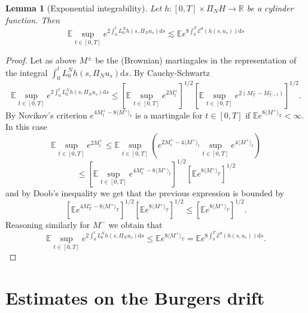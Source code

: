 \documentclass[11pt,a4paper,draft,reqno]{amsart}
\newtheorem{lemma}{Lemma}
\newcommand{\RR}{\mathbb{R}}
\newcommand{\expect}{\mathbb{E}}
\newcommand{\cE}{\mathcal{E}}
\newcommand{\dd}{\mathrm{d}}
\begin{document}
\begin{lemma}[Exponential integrability] 
Let  $h : [0,T]\times \Pi_N H \to \RR$ be a cylinder function. Then
\begin{equation}
\label{eq:exp-ito-trick}
\expect \sup_{t\in[0,T]}e^{2 \int_0^t L_0^N h(s,\Pi_N u_s) \dd s} \lesssim 
\expect e^{8 \int_0^T \cE^\theta(h(s,u_s)) \dd s } 
\end{equation}
\end{lemma}
\begin{proof}
Let as above $M^\pm$ be the (Brownian) martingales in the representation of the integral $\int_0^t L_0^N h(s,\Pi_N u_s) \dd s$. By Cauchy-Schwartz
$$
\expect \sup_{t\in[0,T]}e^{2 \int_0^t L_0^N h(s,\Pi_N u_s) \dd s} \le \left[\expect \sup_{t\in[0,T]}e^{2 M^+_t}\right]^{1/2}  \left[\expect \sup_{t\in[0,T]}e^{2 (M^-_T-M^-_{T-t})}\right]^{1/2}.
$$
By  Novikov's criterion 
$
e^{4 M^+_t - 8 \langle M^+\rangle_t }
$ is a martingale for $t\in[0,T]$ if $\expect e^{8 \langle M^+\rangle_T} < \infty$. In this case
$$
\expect \sup_{t\in[0,T]}e^{2 M^+_t} \le \expect \sup_{t\in[0,T]}(e^{2 M^+_t- 4 \langle M^+\rangle_t}\sup_{t\in[0,T]} e^{ 4 \langle M^+\rangle_t })
$$
$$
\le\left[\expect \sup_{t\in[0,T]} e^{4 M^+_t- 8 \langle M^+\rangle_t}\right]^{1/2} \left[\expect e^{8 \langle M^+\rangle_T }\right]^{1/2}
$$
and by Doob's inequality we get that the previous expression is bounded by
$$
\left[\expect e^{4 M^+_T- 8 \langle M^+\rangle_T}\right]^{1/2} \left[\expect e^{8 \langle M^+\rangle_T }\right]^{1/2}
\le \left[\expect e^{8 \langle M^+\rangle_T }\right]^{1/2}.
$$
Reasoning similarly for $M^-$ we obtain that 
$$
\expect \sup_{t\in[0,T]}e^{2 \int_0^t L_0^N h(s,\Pi_N u_s) \dd s} \le \expect e^{8 \langle M^+\rangle_T } = \expect e^{8 \int_0^T \cE^\theta(h(s,u_s)) \dd s }.
$$
\end{proof}

\section{Estimates on the Burgers drift}
\label{sec:estimates}
\end{document}
